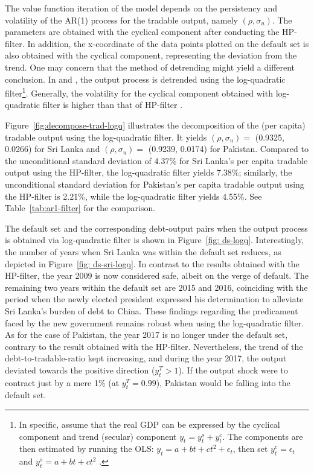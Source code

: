 The value function iteration of the model depends on the persistency and volatility of the AR(1) process for the tradable output, namely $(\rho, \sigma_u)$. The parameters are obtained with the cyclical component after conducting the HP-filter. In addition, the x-coordinate of the data points plotted on the default set is also obtained with the cyclical component, representing the deviation from the trend. One may concern that the method of detrending might yield a different conclusion. In \citet{Na-18} and \cite{Hinrichsen_2020-chapter4}, the output process is detrended using the log-quadratic filter\footnote{
    In specific, assume that the real GDP can be expressed by the cyclical component and trend (secular) component $y_t = y^s_t + y^c_t$. The components are then estimated by running the OLS: $y_t = a + bt + ct^2 + \epsilon_t$, then set $y^c_t = \epsilon_t$ and $y^s_t = a + bt + ct^2$ \citep{Uribe-Schmitt-Grohe-textbook}.
}. Generally, the volatility for the cyclical component obtained with log-quadratic filter is higher than that of HP-filter \citep{Uribe-Schmitt-Grohe-textbook}.

Figure~\ref{fig:decompose-trad-logq} illustrates the decomposition of the (per capita) tradable output using the log-quadratic filter. It yields $(\rho, \sigma_u)=$ (0.9325, 0.0266) for Sri Lanka and $(\rho, \sigma_u)=$ (0.9239, 0.0174) for Pakistan. Compared to the unconditional standard deviation of 4.37\% for Sri Lanka's per capita tradable output using the HP-filter, the log-quadratic filter yields 7.38\%; similarly, the unconditional standard deviation for Pakistan's per capita tradable output using the HP-filter is 2.21\%, while the log-quadratic filter yields 4.55\%.
See Table~\ref{tab:ar1-filter} for the comparison.

The default set and the corresponding debt-output pairs when the output process is obtained via log-quadratic filter is shown in Figure~\ref{fig: ds-logq}. Interestingly, the number of years when Sri Lanka was within the default set reduces, as depicted in Figure~\ref{fig: ds-sri-logq}.
In contrast to the results obtained with the HP-filter, the year 2009 is now considered safe, albeit on the verge of default. The remaining two years within the default set are 2015 and 2016, coinciding with the period when the newly elected president expressed his determination to alleviate Sri Lanka's burden of debt to China. These findings regarding the predicament faced by the new government remains robust when using the log-quadratic filter.
As for the case of Pakistan, the year 2017 is no longer under the default set, contrary to the result obtained with the HP-filter. Nevertheless, the trend of the debt-to-tradable-ratio kept increasing, and during the year 2017, the output deviated towards the positive direction ($y^T_t > 1$). If the output shock were to contract just by a mere 1\% (at $y^T_t = 0.99$), Pakistan would be falling into the default set.